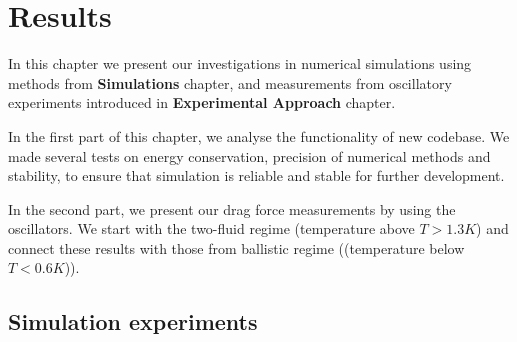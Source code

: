 \chapter{Results}

In this chapter we present our investigations in numerical simulations using methods from \textbf{Simulations} chapter, and measurements from oscillatory experiments introduced in \textbf{Experimental Approach} chapter.

In the first part of this chapter, we analyse the functionality of new codebase. We made several tests on energy conservation, precision of numerical methods and stability, to ensure that simulation is reliable and stable for further development.

In the second part, we present our drag force measurements by using the oscillators. We start with the two-fluid regime (temperature above $T > 1.3 \unit{K}$) and connect these results with those from ballistic regime ((temperature below $T < 0.6 \unit{K}$)).

\section{Simulation experiments}
%
%

